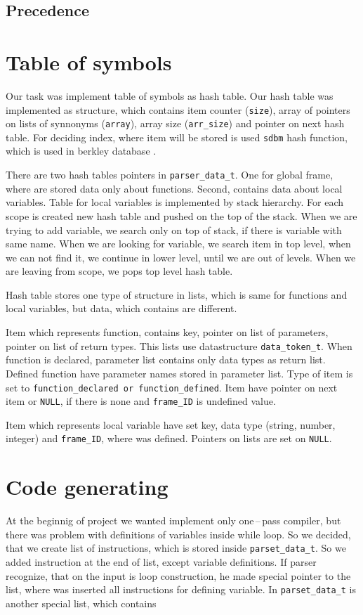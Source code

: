 \documentclass[11pt]{article}
\begin{document}
\subsection{Precedence}

\section{Table of symbols}
Our task was implement table of symbols as hash table. Our hash table was implemented as structure, which contains item counter (\texttt{size}), array of pointers on lists of synnonyms (\texttt{array}),
array size (\texttt{arr\_size}) and pointer on next hash table. For deciding index, where item will be stored is used \texttt{sdbm} hash function, which is used in berkley database \cite{hash_function}. 

There are two hash tables pointers in \texttt{parser\_data\_t}. One for global frame, where are stored data only about functions. Second, contains data about local variables. Table for local variables is implemented by
stack hierarchy. For each scope is created new hash table and pushed on the top of the stack. When we are trying to add variable, we search only on top of stack, if there is variable with same name. When we are looking for variable, we search item in top level, 
when we can not find it, we continue in lower level, until we are out of levels. When we are leaving from scope, we pops top level hash table.

Hash table stores one type of structure in lists, which is same for functions and local variables, but data, which contains are different.

Item which represents function, contains key, pointer on list of parameters, pointer on list of return types. This lists use datastructure \texttt{data\_token\_t}. When function
is declared, parameter list contains only data types as return list. Defined function have parameter names stored in parameter list. Type of item is set to \texttt{function\_declared or function\_defined}.
Item have pointer on next item or \texttt{NULL}, if there is none and \texttt{frame\_ID} is undefined value.

Item which represents local variable have set key, data type (string, number, integer) and \texttt{frame\_ID}, where was defined. Pointers on lists are set on \texttt{NULL}.

\section{Code generating}
At the beginnig of project we wanted implement only one\,--\,pass compiler, but there was problem with definitions of variables inside while loop. So we decided, that we 
create list of instructions, which is stored inside \texttt{parset\_data\_t}. So we added instruction at the end of list, except variable definitions. If parser recognize, that
on the input is loop construction, he made special pointer to the list, where was inserted all instructions for defining variable.
In \texttt{parset\_data\_t} is another special list, which contains 
\end{document}
